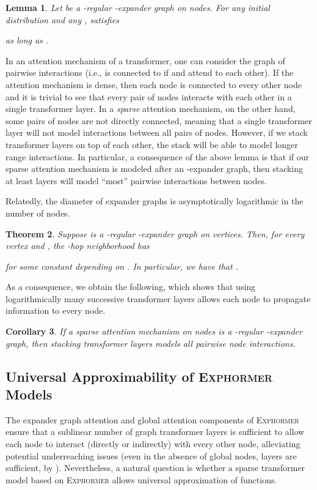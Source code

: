 \documentclass{article}
\theoremstyle{plain}
\newtheorem{theorem}{Theorem}[section]
\newtheorem{lemma}[theorem]{Lemma}
\newtheorem{corollary}[theorem]{Corollary}
\theoremstyle{definition}
\theoremstyle{remark}
\begin{document}
\begin{lemma}\label{lem:mixing}
\citep[Theorem 3.2]{hoory06}
Let  be a -regular -expander graph on  nodes. For any initial distribution  and any ,  satisfies

as long as
.
\end{lemma}


In an attention mechanism of a transformer, one can consider the graph of pairwise interactions (i.e.,  is connected to  if  and  attend to each other). If the attention mechanism is dense, then each node is connected to every other node and it is trivial to see that every pair of nodes interacts with each other in a single transformer layer. In a \emph{sparse} attention mechanism, on the other hand, some pairs of nodes are not directly connected, meaning that a single transformer layer will not model interactions between all pairs of nodes. However, if we stack transformer layers on top of each other, the stack will be able to model longer range interactions.  In particular, a consequence of the above lemma is that if our sparse attention mechanism is modeled after an -expander graph, then stacking at least  layers will model ``most'' pairwise interactions between nodes.


Relatedly, the {diameter} of expander graphs is asymptotically logarithmic in the number of nodes.
\begin{theorem}\citep[Section 2.4]{hoory06}
Suppose  is a -regular -expander graph on  vertices. Then, for every vertex  and , the -hop neighborhood  has
 
 for some constant  depending on 
 . 
 In particular, we have that .
\end{theorem}
As a consequence, we obtain the following, which shows that using logarithmically many successive transformer layers allows each node to propagate information to every node.
\begin{corollary}\label{cor:logdiam}
If a sparse attention mechanism on  nodes is a -regular -expander graph, then stacking  transformer layers models all pairwise node interactions.
\end{corollary}


\subsection{Universal Approximability of \textsc{Exphormer} Models}
The expander graph attention and global attention components of \textsc{Exphormer} ensure that a sublinear number of graph transformer layers is sufficient to allow each node to interact (directly or indirectly) with every other node, alleviating potential underreaching issues (even in the absence of global nodes,  layers are sufficient, by ). Nevertheless, a natural question is whether a sparse transformer model based on \textsc{Exphormer} allows universal approximation of functions.
\end{document}

